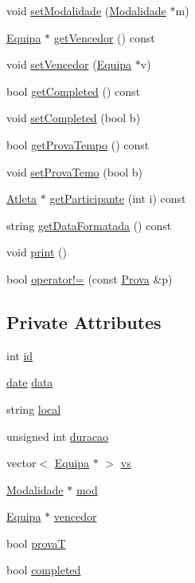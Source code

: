 \begin{DoxyCompactItemize}
\item 
void \hyperlink{class_prova_aef40e220eca46c4fabc0a27b67768e3e}{set\+Modalidade} (\hyperlink{class_modalidade}{Modalidade} $\ast$m)
\item 
\hyperlink{class_equipa}{Equipa} $\ast$ \hyperlink{class_prova_a64d0727625b43e4382e4806c032b2868}{get\+Vencedor} () const 
\item 
void \hyperlink{class_prova_a97b48c140227e28e5a472f7b7bcedd07}{set\+Vencedor} (\hyperlink{class_equipa}{Equipa} $\ast$v)
\item 
bool \hyperlink{class_prova_a5f36832ceb6a8870f5f005cc2ceb5dd2}{get\+Completed} () const 
\item 
void \hyperlink{class_prova_a54eae0a267369ea33421d72418597386}{set\+Completed} (bool b)
\item 
bool \hyperlink{class_prova_a88b8cc8150bb374039a701a37101fbef}{get\+Prova\+Tempo} () const 
\item 
void \hyperlink{class_prova_afea493249261504dbb3629c5834831c8}{set\+Prova\+Temo} (bool b)
\item 
\hyperlink{class_atleta}{Atleta} $\ast$ \hyperlink{class_prova_a34d362f2cfa3c77966e0644203aae796}{get\+Participante} (int i) const 
\item 
string \hyperlink{class_prova_ae170e53e9684644c4cfb5c864413a8b7}{get\+Data\+Formatada} () const 
\item 
void \hyperlink{class_prova_a7bb057ccef0b2b0be425cecc6ab6545e}{print} ()
\item 
bool \hyperlink{class_prova_afc694469d1207f16ffb9525fe2ffda81}{operator!=} (const \hyperlink{class_prova}{Prova} \&p)
\end{DoxyCompactItemize}
\subsection*{Private Attributes}
\begin{DoxyCompactItemize}
\item 
int \hyperlink{class_prova_a23b51edf66d26661629b5330db67c3e7}{id}
\item 
\hyperlink{structdate}{date} \hyperlink{class_prova_a534b71e749122e706bbdd68e6b3410f4}{data}
\item 
string \hyperlink{class_prova_a4ff729b96dc2198a40d05dc7fdc38081}{local}
\item 
unsigned int \hyperlink{class_prova_a858c1f2a4be696df02eebe6419c34dc5}{duracao}
\item 
vector$<$ \hyperlink{class_equipa}{Equipa} $\ast$ $>$ \hyperlink{class_prova_aa085e9c4905e762142b6b735f4dfda30}{vs}
\item 
\hyperlink{class_modalidade}{Modalidade} $\ast$ \hyperlink{class_prova_a9a372fdc63a673192aca93e5b3cdba22}{mod}
\item 
\hyperlink{class_equipa}{Equipa} $\ast$ \hyperlink{class_prova_a9da09789da7cc0ef43b38197c96558fc}{vencedor}
\item 
bool \hyperlink{class_prova_a9b551ecafa591456d49345ceb9ea790d}{prova\+T}
\item 
bool \hyperlink{class_prova_aad473b9a0e23d11ba133ebdeea317522}{completed}
\end{DoxyCompactItemize}
